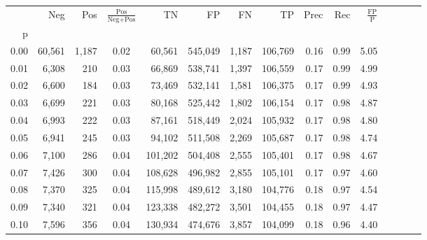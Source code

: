 \begin{tabular}{rrrcrrrrrrrrrrr}
\toprule
{} &     Neg &     Pos & $\frac{\text{Pos}}{\text{Neg}+\text{Pos}}$ &       TN &       FP &       FN &       TP &  Prec &   Rec & $\frac{\text{FP}}{\text{P}}$ \\
p    &         &         &                                            &          &          &          &          &       &       &                              \\
\midrule
0.00 &  60,561 &   1,187 &                                       0.02 &   60,561 &  545,049 &    1,187 &  106,769 &  0.16 &  0.99 &                         5.05 \\
0.01 &   6,308 &     210 &                                       0.03 &   66,869 &  538,741 &    1,397 &  106,559 &  0.17 &  0.99 &                         4.99 \\
0.02 &   6,600 &     184 &                                       0.03 &   73,469 &  532,141 &    1,581 &  106,375 &  0.17 &  0.99 &                         4.93 \\
0.03 &   6,699 &     221 &                                       0.03 &   80,168 &  525,442 &    1,802 &  106,154 &  0.17 &  0.98 &                         4.87 \\
0.04 &   6,993 &     222 &                                       0.03 &   87,161 &  518,449 &    2,024 &  105,932 &  0.17 &  0.98 &                         4.80 \\
0.05 &   6,941 &     245 &                                       0.03 &   94,102 &  511,508 &    2,269 &  105,687 &  0.17 &  0.98 &                         4.74 \\
0.06 &   7,100 &     286 &                                       0.04 &  101,202 &  504,408 &    2,555 &  105,401 &  0.17 &  0.98 &                         4.67 \\
0.07 &   7,426 &     300 &                                       0.04 &  108,628 &  496,982 &    2,855 &  105,101 &  0.17 &  0.97 &                         4.60 \\
0.08 &   7,370 &     325 &                                       0.04 &  115,998 &  489,612 &    3,180 &  104,776 &  0.18 &  0.97 &                         4.54 \\
0.09 &   7,340 &     321 &                                       0.04 &  123,338 &  482,272 &    3,501 &  104,455 &  0.18 &  0.97 &                         4.47 \\
0.10 &   7,596 &     356 &                                       0.04 &  130,934 &  474,676 &    3,857 &  104,099 &  0.18 &  0.96 &                         4.40 \\

\end{tabular}
